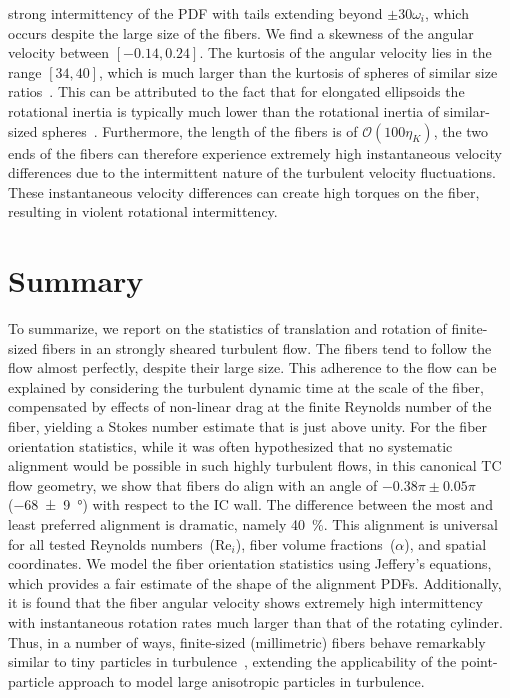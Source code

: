 strong intermittency of the PDF with tails extending beyond $\pm30\omega_i$,
which occurs despite the large size of the fibers. We find a skewness of the
angular velocity between  $[-0.14, 0.24]$. The kurtosis of the angular
velocity lies in the range $[34,40]$, which is much larger than the kurtosis
of spheres of similar size
ratios~\cite{Zimmermann2011,Mathai2016b,Mathai2018b}. This can be attributed
to the fact that for elongated ellipsoids the rotational inertia is typically
much lower than the rotational inertia of similar-sized
spheres~\cite{Zhao2015}. Furthermore, the length of the fibers is of
$\mathcal{O}(100\eta_K)$, the two ends of the fibers can therefore experience extremely high instantaneous velocity differences due to the intermittent nature of the turbulent velocity fluctuations. These instantaneous velocity differences can create high torques on the fiber, resulting in violent rotational intermittency.\\
\section{Summary}
\indent To summarize, we report on the statistics of translation and
rotation of finite-sized fibers in an strongly sheared turbulent
flow. The fibers tend to follow the flow almost perfectly,
despite their large size. This adherence to the flow can be explained by
considering the turbulent dynamic time at the scale of the fiber, compensated
by effects of non-linear drag at the finite Reynolds number of the fiber,
yielding a Stokes number estimate that is just above unity. For the fiber
orientation statistics, while it was often hypothesized that no systematic
alignment would be possible in such highly turbulent flows, in this canonical TC
flow geometry, we show that fibers do align with an angle of $-0.38\pi \pm 0.05\pi$
(\SI[separate-uncertainty =
true,multi-part-units=single]{-68(9)}{\degree}) with respect to the IC wall. The difference between the most and least preferred alignment is dramatic, namely \SI{40}{\percent}. This
alignment is universal for all tested Reynolds numbers~($\text{Re}_i$), fiber
volume fractions~($\alpha$), and spatial coordinates.
We model the fiber orientation statistics using
Jeffery's equations, which provides a fair estimate of the shape of the
alignment PDFs. Additionally, it is found that the fiber angular velocity
shows extremely high intermittency with instantaneous rotation rates much larger than that of the rotating cylinder. Thus, in a number of ways,
finite-sized (millimetric) fibers behave remarkably similar to tiny particles
in turbulence~\cite{Voth2017,Toschi2009}, extending the applicability of the
point-particle approach to model large anisotropic particles in turbulence.

\graphicspath{{fig/}}

